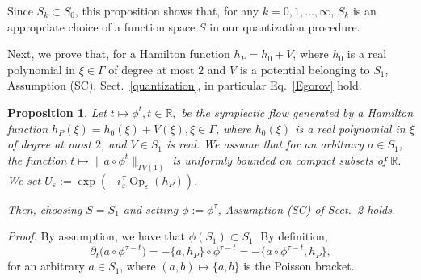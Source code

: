 \documentclass[12pt]{article}
\DeclareMathOperator{\Op}{Op}
\newtheorem{proposition}[theorem]{Proposition}
\begin{document}
\vspace{0.15cm}Since $S_k\subset S_0$, this proposition shows that, for any $k=0,1,\dotsc,\infty$, $S_k$ is an appropriate choice 
of a function space $S$ in our quantization procedure.

\medskip
Next, we prove that, for a Hamilton function $h_P=h_0+V$, where $h_0$ is a real polynomial in $\xi\in \Gamma$ 
of degree at most $2$ and $V$ is a potential belonging to $S_1$, Assumption (SC), Sect.~\ref{quantization}, in particular 
Eq.~\eqref{Egorov} hold.
\begin{proposition}
	Let $t\mapsto \phi^t, t\in \mathbb{R},$ be the symplectic flow generated by a Hamilton function 
	$h_{P}(\xi) = h_0(\xi)+V(\xi), \xi \in \Gamma$,
	 where $h_0(\xi)$ is a real polynomial in $\xi$ of degree at most $2$, and $V\in S_1$ is real. We assume that for an arbitrary
	 $a\in S_1$, the function $t\mapsto\|a\circ\phi^t\|_{TV(1)}$ is uniformly bounded on compact subsets of $\mathbb{R}$.
	 We set $U_\varepsilon:=\exp\left(-i\frac{\tau}{\varepsilon} \Op_\varepsilon(h_P)\right)$.
	 
	 Then, choosing $S=S_1$ and setting $\phi:=\phi^{\tau}$, Assumption (SC) of Sect.~2 holds. \end{proposition}

\noindent \textit{Proof.} By assumption, we have that $\phi(S_1)\subset S_1$. By definition,  
	$$\partial_t \big(a\circ\phi^{\tau-t}\big)=-\{a,h_P\}\circ\phi^{\tau-t}=-\{a\circ\phi^{\tau-t},h_P\},$$ 
	for an arbitrary $a\in S_1$, where $(a,b)\mapsto\{a,b\}$ is the Poisson bracket. 
	
\end{document}
